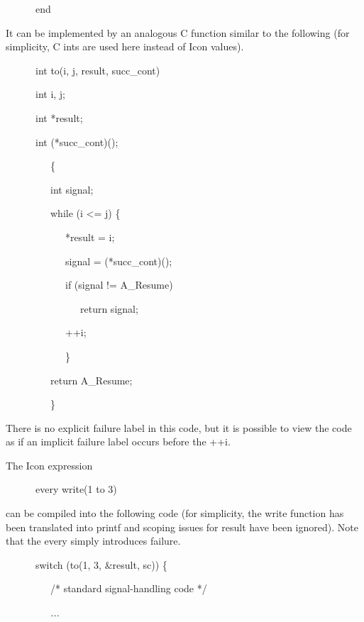 {\ttfamily\mdseries
\ \ \ \ \ \ end}


It can be implemented by an analogous C function similar to the
following (for simplicity, C ints are used here instead of Icon
values).

{\ttfamily\mdseries
\ \ \ \ \ \ int to(i, j, result, succ\_cont)}

{\ttfamily\mdseries
\ \ \ \ \ \ int i, j;}

{\ttfamily\mdseries
\ \ \ \ \ \ int *result;}

{\ttfamily\mdseries
\ \ \ \ \ \ int (*succ\_cont)();}

{\ttfamily\mdseries
\ \ \ \ \ \ \ \ \ \{}

{\ttfamily\mdseries
\ \ \ \ \ \ \ \ \ int signal;}


\bigskip

{\ttfamily\mdseries
\ \ \ \ \ \ \ \ \ while (i {\textless}= j) \{}

{\ttfamily\mdseries
\ \ \ \ \ \ \ \ \ \ \ \ *result = i;}

{\ttfamily\mdseries
\ \ \ \ \ \ \ \ \ \ \ \ signal = (*succ\_cont)();}

{\ttfamily\mdseries
\ \ \ \ \ \ \ \ \ \ \ \ if (signal != A\_Resume)}

{\ttfamily\mdseries
\ \ \ \ \ \ \ \ \ \ \ \ \ \ \ return signal;}

{\ttfamily\mdseries
\ \ \ \ \ \ \ \ \ \ \ \ ++i;}

{\ttfamily\mdseries
\ \ \ \ \ \ \ \ \ \ \ \ \}}

{\ttfamily\mdseries
\ \ \ \ \ \ \ \ \ return A\_Resume;}

{\ttfamily\mdseries
\ \ \ \ \ \ \ \ \ \}}


There is no explicit failure label in this code, but it is possible to
view the code as if an implicit failure label occurs before the ++i.


The Icon expression 

{\ttfamily\mdseries
\ \ \ \ \ \ every write(1 to 3)}

\noindent can be compiled into the following code (for simplicity, the
write function has been translated into printf and scoping issues for
result have been ignored). Note that the every simply introduces failure.

{\ttfamily\mdseries
\ \ \ \ \ \ switch (to(1, 3, \&result, sc)) \{}

{\ttfamily\mdseries
\ \ \ \ \ \ \ \ \ /* standard signal-handling code */}

{\ttfamily\mdseries
\ \ \ \ \ \ \ \ \ \textit{...}}

